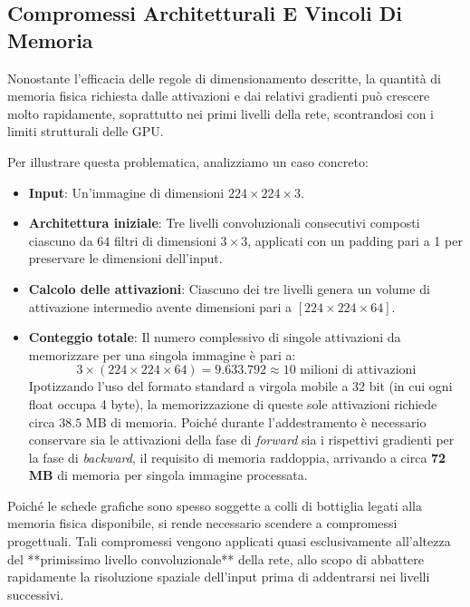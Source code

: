 ﻿\documentclass[11pt, a4paper]{article}
\begin{document}
\subsection{Compromessi Architetturali E Vincoli Di Memoria}

Nonostante l'efficacia delle regole di dimensionamento descritte, la quantità di memoria fisica richiesta dalle attivazioni e dai relativi gradienti può crescere molto rapidamente, soprattutto nei primi livelli della rete, scontrandosi con i limiti strutturali delle GPU.

Per illustrare questa problematica, analizziamo un caso concreto:
\begin{itemize}
    \item \textbf{Input}: Un'immagine di dimensioni $224 \times 224 \times 3$.
    \item \textbf{Architettura iniziale}: Tre livelli convoluzionali consecutivi composti ciascuno da $64$ filtri di dimensioni $3 \times 3$, applicati con un padding pari a 1 per preservare le dimensioni dell'input.
    \item \textbf{Calcolo delle attivazioni}: Ciascuno dei tre livelli genera un volume di attivazione intermedio avente dimensioni pari a $[224 \times 224 \times 64]$.
    \item \textbf{Conteggio totale}: Il numero complessivo di singole attivazioni da memorizzare per una singola immagine è pari a:
    \[
    3 \times (224 \times 224 \times 64) = 9.633.792 \approx 10 \text{ milioni di attivazioni}
    \]
    Ipotizzando l'uso del formato standard a virgola mobile a 32 bit (in cui ogni float occupa 4 byte), la memorizzazione di queste sole attivazioni richiede circa $38.5\text{ MB}$ di memoria. Poiché durante l'addestramento è necessario conservare sia le attivazioni della fase di \emph{forward} sia i rispettivi gradienti per la fase di \emph{backward}, il requisito di memoria raddoppia, arrivando a circa \textbf{72 MB} di memoria per singola immagine processata.
\end{itemize}

Poiché le schede grafiche sono spesso soggette a colli di bottiglia legati alla memoria fisica disponibile, si rende necessario scendere a compromessi progettuali. Tali compromessi vengono applicati quasi esclusivamente all'altezza del **primissimo livello convoluzionale** della rete, allo scopo di abbattere rapidamente la risoluzione spaziale dell'input prima di addentrarsi nei livelli successivi.
\end{document}
